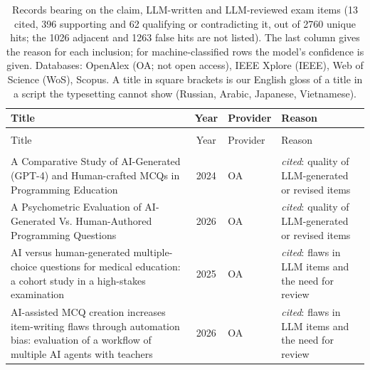 
\begingroup\footnotesize
\begin{longtable}{@{}%
  >{\raggedright\arraybackslash}p{}c%
  >{\raggedright\arraybackslash}p{}%
  >{\raggedright\arraybackslash}p{}@{}}
\caption{Records bearing on the claim, LLM-written and LLM-reviewed exam items (13 cited, 396 supporting and 62 qualifying or contradicting it, out of 2760 unique hits; the 1026 adjacent and 1263 false hits are not listed). The last column gives the reason for each inclusion; for machine-classified rows the model's confidence is given. Databases: OpenAlex (OA; not open access), IEEE Xplore (IEEE), Web of Science (WoS), Scopus. A title in square brackets is our English gloss of a title in a script the typesetting cannot show (Russian, Arabic, Japanese, Vietnamese).}\label{tab:sok-llm-items}\\
\toprule
Title & Year & Provider & Reason \\
\midrule
\endfirsthead
\multicolumn{4}{@{}l}{\emph{\tablename~\thetable{} (cont.)}}\\
\toprule
Title & Year & Provider & Reason \\
\midrule
\endhead
\midrule \multicolumn{4}{r@{}}{\emph{continued on next page}}\\
\endfoot
\bottomrule
\endlastfoot
A Comparative Study of AI-Generated (GPT-4) and Human-crafted MCQs in Programming Education & 2024 & OA & \emph{cited}: quality of LLM-generated or revised items \\
A Psychometric Evaluation of AI-Generated Vs. Human-Authored Programming Questions & 2026 & OA & \emph{cited}: quality of LLM-generated or revised items \\
AI versus human-generated multiple-choice questions for medical education: a cohort study in a high-stakes examination & 2025 & OA & \emph{cited}: flaws in LLM items and the need for review \\
AI-assisted MCQ creation increases item-writing flaws through automation bias: evaluation of a workflow of multiple AI agents with teachers & 2026 & OA & \emph{cited}: flaws in LLM items and the need for review \\

\end{longtable}
